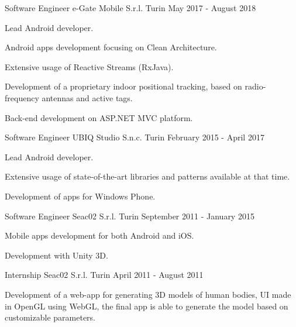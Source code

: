 \begin{cventries}
  \cventry
    {Software Engineer} %
    {e-Gate Mobile S.r.l.} %
    {Turin} %
    {May 2017 - August 2018} %
    {
      \begin{cvitems} %
        \item {Lead Android developer.}
        \item {Android apps development focusing on Clean Architecture.}
        \item {Extensive usage of Reactive Streams (RxJava).}
        \item {Development of a proprietary indoor positional tracking, based on radio-frequency antennas and active tags.}
        \item {Back-end development on ASP.NET MVC platform.}
      \end{cvitems}
    }

  \cventry
    {Software Engineer} %
    {UBIQ Studio S.n.c.} %
    {Turin} %
    {February 2015 - April 2017} %
    {
      \begin{cvitems} %
        \item {Lead Android developer.}
        \item {Extensive usage of state-of-the-art libraries and patterns available at that time.}
        \item {Development of apps for Windows Phone.}
      \end{cvitems}
    }

  \cventry
    {Software Engineer} %
    {Seac02 S.r.l.} %
    {Turin} %
    {September 2011 - January 2015} %
    {
      \begin{cvitems} %
        \item {Mobile apps development for both Android and iOS.}
        \item {Development with Unity 3D.}
      \end{cvitems}
    }

  \cventry
    {Internship} %
    {Seac02 S.r.l.} %
    {Turin} %
    {April 2011 - August 2011} %
    {
      \begin{cvitems} %
        \item {Development of a web-app for generating 3D models of human bodies, UI made in OpenGL using WebGL, the final app is able to generate the model based on customizable parameters.}
      \end{cvitems}
    }


\end{cventries}
